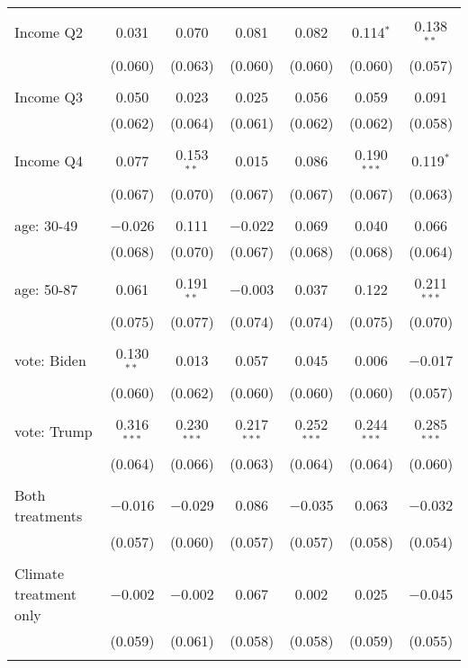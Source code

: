 \begin{tabular}{@{\extracolsep{5pt}}lcccccc}
  & & & & & & \\ 
 Income Q2 & 0.031 & 0.070 & 0.081 & 0.082 & 0.114$^{*}$ & 0.138$^{**}$ \\ 
  & (0.060) & (0.063) & (0.060) & (0.060) & (0.060) & (0.057) \\ 
  & & & & & & \\ 
 Income Q3 & 0.050 & 0.023 & 0.025 & 0.056 & 0.059 & 0.091 \\ 
  & (0.062) & (0.064) & (0.061) & (0.062) & (0.062) & (0.058) \\ 
  & & & & & & \\ 
 Income Q4 & 0.077 & 0.153$^{**}$ & 0.015 & 0.086 & 0.190$^{***}$ & 0.119$^{*}$ \\ 
  & (0.067) & (0.070) & (0.067) & (0.067) & (0.067) & (0.063) \\ 
  & & & & & & \\ 
 age: 30-49 & $-$0.026 & 0.111 & $-$0.022 & 0.069 & 0.040 & 0.066 \\ 
  & (0.068) & (0.070) & (0.067) & (0.068) & (0.068) & (0.064) \\ 
  & & & & & & \\ 
 age: 50-87 & 0.061 & 0.191$^{**}$ & $-$0.003 & 0.037 & 0.122 & 0.211$^{***}$ \\ 
  & (0.075) & (0.077) & (0.074) & (0.074) & (0.075) & (0.070) \\ 
  & & & & & & \\ 
 vote: Biden & 0.130$^{**}$ & 0.013 & 0.057 & 0.045 & 0.006 & $-$0.017 \\ 
  & (0.060) & (0.062) & (0.060) & (0.060) & (0.060) & (0.057) \\ 
  & & & & & & \\ 
 vote: Trump & 0.316$^{***}$ & 0.230$^{***}$ & 0.217$^{***}$ & 0.252$^{***}$ & 0.244$^{***}$ & 0.285$^{***}$ \\ 
  & (0.064) & (0.066) & (0.063) & (0.064) & (0.064) & (0.060) \\ 
  & & & & & & \\ 
 Both treatments & $-$0.016 & $-$0.029 & 0.086 & $-$0.035 & 0.063 & $-$0.032 \\ 
  & (0.057) & (0.060) & (0.057) & (0.057) & (0.058) & (0.054) \\ 
  & & & & & & \\ 
 Climate treatment only & $-$0.002 & $-$0.002 & 0.067 & 0.002 & 0.025 & $-$0.045 \\ 
  & (0.059) & (0.061) & (0.058) & (0.058) & (0.059) & (0.055) \\ 
  & & & & & & \\ 

\end{tabular}
